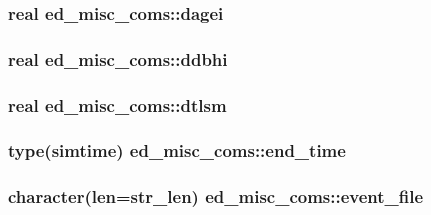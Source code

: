 \subsubsection[{\texorpdfstring{dagei}{dagei}}]{\setlength{\rightskip}{0pt plus 5cm}real ed\+\_\+misc\+\_\+coms\+::dagei}\hypertarget{namespaceed__misc__coms_a6dedccb6bd1fa55c04ad14eee4ddb95e}{}\label{namespaceed__misc__coms_a6dedccb6bd1fa55c04ad14eee4ddb95e}
\subsubsection[{\texorpdfstring{ddbhi}{ddbhi}}]{\setlength{\rightskip}{0pt plus 5cm}real ed\+\_\+misc\+\_\+coms\+::ddbhi}\hypertarget{namespaceed__misc__coms_addd21c151c013090994c5471206d6595}{}\label{namespaceed__misc__coms_addd21c151c013090994c5471206d6595}
\subsubsection[{\texorpdfstring{dtlsm}{dtlsm}}]{\setlength{\rightskip}{0pt plus 5cm}real ed\+\_\+misc\+\_\+coms\+::dtlsm}\hypertarget{namespaceed__misc__coms_ae6a9bf60ef97f576201d615634834480}{}\label{namespaceed__misc__coms_ae6a9bf60ef97f576201d615634834480}
\subsubsection[{\texorpdfstring{end\+\_\+time}{end_time}}]{\setlength{\rightskip}{0pt plus 5cm}type({\bf simtime}) ed\+\_\+misc\+\_\+coms\+::end\+\_\+time}\hypertarget{namespaceed__misc__coms_a6b19c4e99a003ac8f1dbda410dd35599}{}\label{namespaceed__misc__coms_a6b19c4e99a003ac8f1dbda410dd35599}
\subsubsection[{\texorpdfstring{event\+\_\+file}{event_file}}]{\setlength{\rightskip}{0pt plus 5cm}character(len=str\+\_\+len) ed\+\_\+misc\+\_\+coms\+::event\+\_\+file}\hypertarget{namespaceed__misc__coms_ab72c19aca546884ef6b4a1b38aa52500}{}\label{namespaceed__misc__coms_ab72c19aca546884ef6b4a1b38aa52500}
